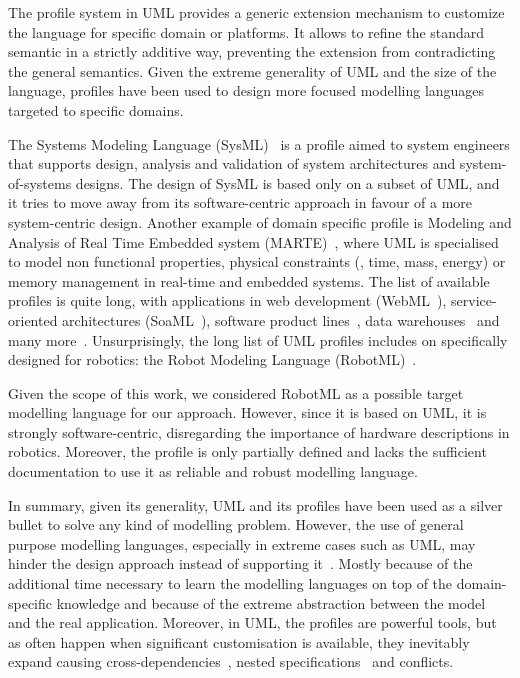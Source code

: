 The profile system in UML provides a generic extension mechanism to customize the language for specific domain or platforms. It allows to refine the standard semantic in a strictly additive way, preventing the extension from contradicting the general semantics. Given the extreme generality of UML and the size of the language, profiles have been used to design more focused modelling languages targeted to specific domains.

The Systems Modeling Language (SysML)~\cite{friedenthal2014practical} is a profile aimed to system engineers that supports design, analysis and validation of system architectures and system-of-systems designs. The design of SysML is based only on a subset of UML, and it tries to move away from its software-centric approach in favour of a more system-centric design. Another example of domain specific profile is Modeling and Analysis of Real Time Embedded system (MARTE)~\cite{faugere2007marte}, where UML is specialised to model non functional properties, physical constraints (\eg, time, mass, energy) or memory management in real-time and embedded systems. The list of available profiles is quite long, with applications in web development (WebML~\cite{ceri2000web}), service-oriented architectures (SoaML~\cite{elvesaeter2011model}), software product lines~\cite{ziadi2003towards}, data warehouses~\cite{lujan2006uml} and many more~\cite{fontoura2000uml, aldawud2001uml}. Unsurprisingly, the long list of UML profiles includes on specifically designed for robotics: the Robot Modeling Language (RobotML)~\cite{dhouib2012robotml}.

Given the scope of this work, we considered RobotML as a possible target modelling language for our approach. However, since it is based on UML, it is strongly software-centric, disregarding the importance of hardware descriptions in robotics. Moreover, the profile is only partially defined and lacks the sufficient documentation to use it as reliable and robust modelling language.

In summary, given its generality, UML and its profiles have been used as a silver bullet to solve any kind of modelling problem. However, the use of general purpose modelling languages, especially in extreme cases such as UML, may hinder the design approach instead of supporting it~\cite{simons199930, bonnet2016not}. Mostly because of the additional time necessary to learn the modelling languages on top of the domain-specific knowledge and because of the extreme abstraction between the model and the real application. Moreover, in UML, the profiles are powerful tools, but as often happen when significant customisation is available, they inevitably expand causing cross-dependencies~\cite{espinoza2009challenges}, nested specifications~\cite{faugere2007marte} and conflicts.

